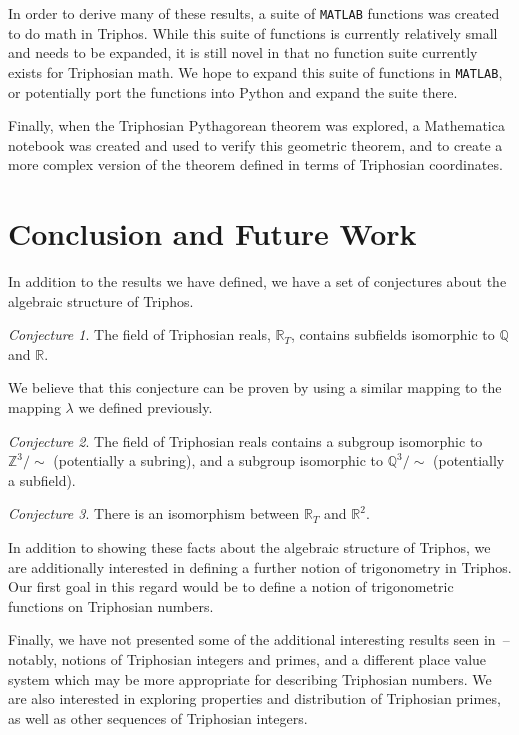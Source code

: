 \documentclass[11pt]{article}
\newcommand{\Tri}{\mathbb{R}_T}
\theoremstyle{definition}
\theoremstyle{plain}
\theoremstyle{remark}
\newtheorem*{conjecture}{Conjecture}
\begin{document}
	In order to derive many of these results, a suite of \texttt{MATLAB}
	functions was created to do math in Triphos. While this suite of functions
	is currently relatively small and needs to be expanded, it is still novel
	in that no function suite currently exists for Triphosian math. We hope to
	expand this suite of functions in \texttt{MATLAB}, or potentially port the
	functions into Python and expand the suite there.

	Finally, when the Triphosian Pythagorean theorem was explored, a
	Mathematica notebook was created and used to verify this geometric theorem,
	and to create a more complex version of the theorem defined in terms of
	Triphosian coordinates.

	\section{Conclusion and Future Work}

	In addition to the results we have defined, we have a set of conjectures
	about the algebraic structure of Triphos.

	\begin{conjecture}
		The field of Triphosian reals, \(\Tri\), contains subfields isomorphic
		to \(\mathbb{Q}\) and \(\mathbb{R}\).
	\end{conjecture}

	We believe that this conjecture can be proven by using a similar mapping to
	the mapping \(\lambda\) we defined previously.

	\begin{conjecture}
		The field of Triphosian reals contains a subgroup isomorphic to
		\(\mathbb{Z}^3/\sim\) (potentially a subring), and a subgroup
		isomorphic to \(\mathbb{Q}^3/\sim\) (potentially a subfield).
	\end{conjecture}

	\begin{conjecture}
		There is an isomorphism between \(\Tri\) and \(\mathbb{R}^2.\)
	\end{conjecture}

	In addition to showing these facts about the algebraic structure of
	Triphos, we are additionally interested in defining a further notion of
	trigonometry in Triphos. Our first goal in this regard would be to define a
	notion of trigonometric functions on Triphosian numbers.

	Finally, we have not presented some of the additional interesting results
	seen in~\cite{grossnickle}--notably, notions of Triphosian integers and
	primes, and a different place value system which may be more appropriate
	for describing Triphosian numbers. We are also interested in exploring
	properties and distribution of Triphosian primes, as well as other
	sequences of Triphosian integers.
\end{document}
